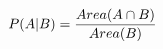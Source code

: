 \documentclass[preview]{standalone}
\begin{document}
\begin{align*}
P(A|B) = {Area(A \cap B) \over Area(B)}
\end{align*}
\end{document}

